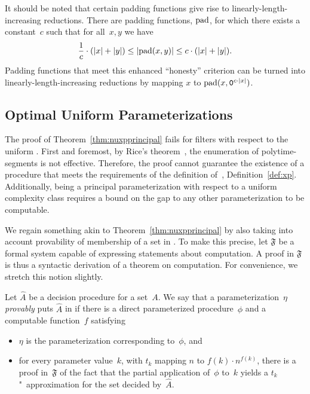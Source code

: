 It should be noted that certain padding functions give rise to linearly-length-increasing reductions.
There are padding functions, $\operatorname{pad}$, for which there exists a constant~$c$ such that for all~$x, y$ we have
\begin{equation*}
  \frac{1}{c} \cdot ({\lvert x\rvert} + {\lvert y\rvert}) \le {\lvert\operatorname{pad}(x, y)\rvert} \le c \cdot ({\lvert x\rvert} + {\lvert y\rvert}).
\end{equation*}
Padding functions that meet this enhanced \enquote{honesty} criterion \parencite[see][]{balcazar1995structural,balcazar1990structural} can be turned into linearly-length-increasing reductions by mapping $x$ to $\operatorname{pad}(x, \textnormal{\texttt{0}}^{c \cdot {\lvert x\rvert}})$.

\subsection{Optimal Uniform Parameterizations}
\label{sec:tractability:optimal}%
\label{sec:optimal_uniform_parameterizations}%
The proof of Theorem~\ref{thm:nuxpprincipal} fails for filters with respect to the uniform .
First and foremost, by Rice's theorem~\parencite{rice1953classes}, the enumeration of polytime-segments is not effective.
Therefore, the proof cannot guarantee the existence of a procedure that meets the requirements of the definition of~, Definition~\ref{def:xp}.
Additionally, being a principal parameterization with respect to a uniform complexity class requires a bound on the gap to any other parameterization to be computable.

We regain something akin to Theorem~\ref{thm:nuxpprincipal} by also taking into account provability of membership of a set in .
To make this precise, let $\mathfrak{F}$ be a formal system capable of expressing statements about computation.
A proof in $\mathfrak{F}$ is thus a syntactic derivation of a theorem on computation.
For convenience, we stretch this notion slightly.
\begin{definition}
\label{def:provably}%
  Let $\hat{A}$ be a decision procedure for a set~$A$.
  We say that a parameterization~$\eta$ \emph{provably} puts $\hat{A}$ in  if there is a direct parameterized procedure~$\phi$ and a computable function~$f$ satisfying
  \begin{itemize}
  \item $\eta$ is the parameterization corresponding to~$\phi$, and
  \item for every parameter value~$k$, with $t_k$ mapping $n$ to $f(k) \cdot n^{f(k)}$, there is a proof in~$\mathfrak{F}$ of the fact that the partial application of~$\phi$ to~$k$ yields a $t_k$"~approximation for the set decided by~$\hat{A}$.
  \end{itemize}
\end{definition}


